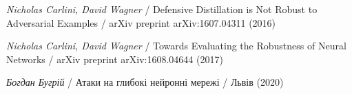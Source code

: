 \documentclass[14pt,a4paper]{extarticle}
\newcounter{e}
\numberwithin{equation}{section}
\numberwithin{figure}{section}
\begin{document}
\begin{thebibliography}{99}
	\textit{Nicholas Carlini, David Wagner} /
	Defensive Distillation is Not Robust to Adversarial Examples /
	arXiv preprint arXiv:1607.04311 (2016)
	
	\textit{Nicholas Carlini, David Wagner} /
	Towards Evaluating the Robustness of Neural Networks /
	arXiv preprint arXiv:1608.04644 (2017)
	
	\textit{Богдан Бугрій} /
	Атаки на глибокі нейронні мережі /
	Львів (2020)
	
	
 \end{thebibliography}

 
\end{document}
